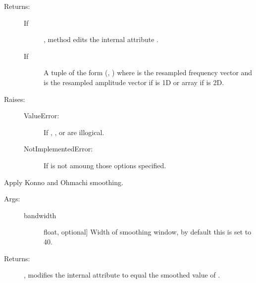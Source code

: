 \documentclass[letterpaper,10pt,english]{sphinxmanual}
\begin{document}
\begin{fulllineitems}
\begin{fulllineitems}
\begin{description}
\begin{description}
\end{description}

\item[{Returns:}] \leavevmode\begin{description}
\item[{If }] \leavevmode
{}, method edits the internal attribute .

\item[{If }] \leavevmode
A tuple of the form (, )
where  is the resampled frequency vector and 
 is the resampled amplitude vector if 
 is 1D or array if  is 2D.

\end{description}

\item[{Raises:}] \leavevmode\begin{description}
\item[{ValueError:}] \leavevmode
If , , or  are illogical.

\item[{NotImplementedError:}] \leavevmode
If  is not amoung those options specified.

\end{description}

\end{description}

\end{fulllineitems}


\begin{fulllineitems}
\label{\detokenize{index:sigpropy.FourierTransform.smooth_konno_ohmachi}}
Apply Konno and Ohmachi smoothing.
\begin{description}
\item[{Args:}] \leavevmode\begin{description}
\item[{bandwidth}] \leavevmode{[}float, optional{]}
Width of smoothing window, by default this is set to 40.

\end{description}

\item[{Returns:}] \leavevmode
{}, modifies the internal attribute  to equal the
smoothed value of .

\end{description}

\end{fulllineitems}


\end{fulllineitems}




\renewcommand{\indexname}{Index}
\printindex
\end{document}
